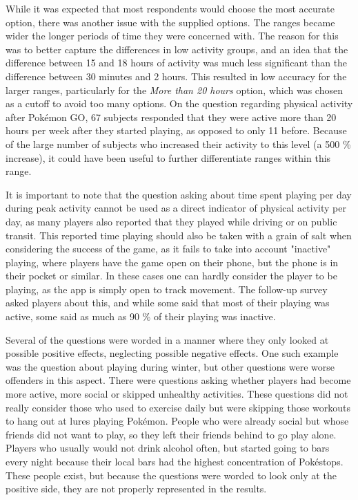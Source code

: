 While it was expected that most respondents would choose the most accurate option, there was another issue with the supplied options. The ranges became wider the longer periods of time they were concerned with. The reason for this was to better capture the differences in low activity groups, and an idea that the difference between 15 and 18 hours of activity was much less significant than the difference between 30 minutes and 2 hours. This resulted in low accuracy for the larger ranges, particularly for the \emph{More than 20 hours} option, which was chosen as a cutoff to avoid too many options. On the question regarding physical activity after Pokémon GO, 67 subjects responded that they were active more than 20 hours per week after they started playing, as opposed to only 11 before. Because of the large number of subjects who increased their activity to this level (a 500 \% increase), it could have been useful to further differentiate ranges within this range. 

It is important to note that the question asking about time spent playing per day during peak activity cannot be used as a direct indicator of physical activity per day, as many players also reported that they played while driving or on public transit. This reported time playing should also be taken with a grain of salt when considering the success of the game, as it fails to take into account "inactive" playing, where players have the game open on their phone, but the phone is in their pocket or similar. In these cases one can hardly consider the player to be playing, as the app is simply open to track movement. The follow-up survey asked players about this, and while some said that most of their playing was active, some said as much as 90 \% of their playing was inactive. 

Several of the questions were worded in a manner where they only looked at possible positive effects, neglecting possible negative effects. One such example was the question about playing during winter, but other questions were worse offenders in this aspect. There were questions asking whether players had become more active, more social or skipped unhealthy activities. These questions did not really consider those who used to exercise daily but were skipping those workouts to hang out at lures playing Pokémon. People who were already social but whose friends did not want to play, so they left their friends behind to go play alone. Players who usually would not drink alcohol often, but started going to bars every night because their local bars had the highest concentration of Pokéstops. These people exist, but because the questions were worded to look only at the positive side, they are not properly represented in the results.

